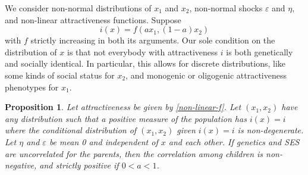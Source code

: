 \documentclass[
  12pt,
]{article}
\newtheorem{proposition}{Proposition}
\theoremstyle{definition}
\theoremstyle{definition}
\theoremstyle{definition}
\theoremstyle{definition}
\theoremstyle{remark}
\begin{document}
We consider non-normal distributions of \(x_1\) and \(x_2\), non-normal
shocks \(\varepsilon\) and \(\eta\), and non-linear attractiveness functions. Suppose
\begin{equation}\label{non-linear-f} 
i(x) = f(ax_1, (1-a)x_2) 
\end{equation}
with \(f\) strictly increasing in both its arguments. Our sole condition on the
distribution of \(x\) is that not everybody with attractiveness \(i\) is both
genetically and socially identical. In particular, this allows for discrete
distributions, like some kinds of social status for \(x_2\), and monogenic or
oligogenic attractiveness phenotypes for \(x_1\).

\begin{proposition}\label{prop-non-normal}
Let attractiveness be given by \eqref{non-linear-f}. Let $(x_1, x_2)$ have
any distribution such that a positive measure of the population has
$i(x) = i$ where the conditional distribution of $(x_1, x_2)$ given $i(x) = i$ is 
non-degenerate. Let $\eta$ and $\varepsilon$ be mean 0 and independent of
$x$ and each other. If genetics and SES are uncorrelated for the parents, then
the correlation among children is non-negative, and strictly positive if 
$0 < a < 1$.
\end{proposition}
\end{document}
